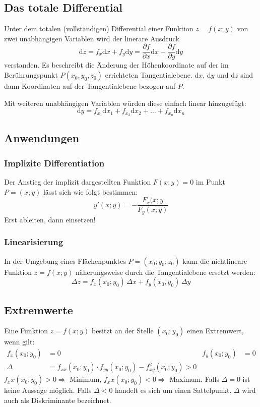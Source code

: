 \subsection{Das totale Differential}
Unter dem totalen (vollständigen) Differential einer Funktion $z = f(x; y)$ von zwei unabhängigen Variablen wird der linerare Ausdruck
\begin{equation*}
	\mathrm dz = f_x \mathrm dx + f_y \mathrm dy = \frac{\partial f}{\partial x} \mathrm dx + \frac{\partial f}{\partial y} \mathrm dy
\end{equation*}
verstanden. Es beschreibt die Änderung der Höhenkoordinate auf der im Berührungspunkt $P(x_0, y_0, z_0)$ errichteten Tangentialebene. d$x$, d$y$ und d$z$ sind dann Koordinaten auf der Tangentialebene bezogen auf $P$.

Mit weiteren unabhängigen Variablen würden diese einfach linear hinzugefügt:
\begin{equation*}
	\mathrm dy = f_{x_1} \mathrm dx_1 + f_{x_2} \mathrm dx_2 + \dots + f_{x_n} \mathrm dx_n
\end{equation*}

\subsection{Anwendungen}
\subsubsection{Implizite Differentiation}
Der Anstieg der implizit dargestellten Funktion $F(x; y) = 0$ im Punkt $P = (x; y)$ lässt sich wie folgt bestimmen:
\begin{equation*}
	y'(x; y) = - \frac{F_x(x; y}{F_y(x; y)}
\end{equation*}
Erst ableiten, dann einsetzen!

\subsubsection{Linearisierung}
In der Umgebung eines Flächenpunktes $P = (x_0; y_0; z_0)$ kann die nichtlineare Funktion $z = f(x; y)$ näherungsweise durch die Tangentialebene ersetzt werden:
\begin{equation*}
	\Delta z = f_x(x_0; y_0) \, \Delta x + f_y(x_0, y_0) \, \Delta y
\end{equation*}

\subsection{Extremwerte}
Eine Funktion $z = f(x; y)$ besitzt an der Stelle $(x_0; y_0)$ einen Extremwert, wenn gilt:
\begin{align*}
	f_x(x_0; y_0)& = 0 & f_y(x_0; y_0)& = 0\\
	\Delta & = f_{xx}(x_0; y_0) \cdot f_{yy}(x_0; y_0) - f_{xy}^2(x_0; y_0) > 0
\end{align*}
$f_xx(x_0; y_0) > 0 \Rightarrow $ Minimum, $f_xx(x_0; y_0) < 0 \Rightarrow $ Maximum.
Falls $\Delta = 0$ ist keine Aussage möglich. Falls $\Delta < 0$ handelt es sich um einen Sattelpunkt. $\Delta$ wird auch als Diskriminante bezeichnet. 